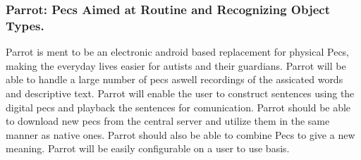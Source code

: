 \documentclass{report}
\begin{document}
\subsubsection*{Parrot: Pecs Aimed at Routine and Recognizing Object Types.}

Parrot is ment to be an electronic android based replacement for physical Pecs, making the everyday lives easier for autists and their guardians.
Parrot will be able to handle a large number of pecs aswell recordings of the assicated words and descriptive text.
Parrot will enable the user to construct sentences using the digital pecs and playback the sentences for comunication.
Parrot should be able to download new pecs from the central server and utilize them in the same manner as native ones.
Parrot should also be able to combine Pecs to give a new meaning.
Parrot will be easily configurable on a user to use basis.
\end{document}
